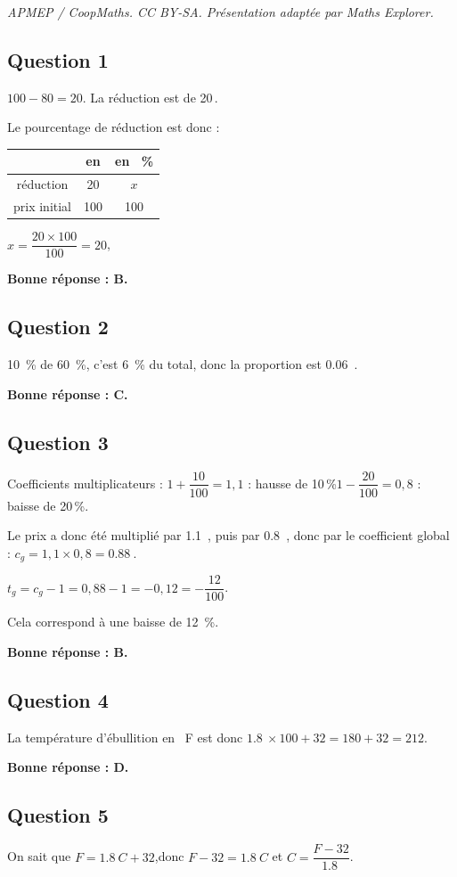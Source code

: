 \documentclass[10pt]{article}
\providecommand{\euro}{\texteuro}
\providecommand{\np}[2][]{{#2~#1}}
\providecommand{\euro}{{\text{€}}}
\renewcommand{\euro}{\ifmmode\text{\texteuro}\else\texteuro\fi}
\begin{document}
\noindent\textit{APMEP / CoopMaths. CC BY-SA. Présentation adaptée par Maths Explorer.}\par\medskip
\subsection*{Question 1}
	$100 - 80  =  20$.
	\quad
	La réduction est de 20\,\euro{}.

	Le pourcentage de réduction est donc :\quad
		\begin{tabular}{c|c|c}
	&en \euro  &en ~\% \\\hline
		réduction	& 20 &$x$  \\\hline
		prix initial&100&100\\
	\end{tabular}\qquad
	\mbox{$x = \dfrac{20\times100}{100} = 20$},

	\textbf{Bonne réponse : B.}

\subsection*{Question 2}
	10~\% de 60~\%, c'est 6~\% du total, donc la proportion est \np{0.06}.

	\textbf{Bonne réponse : C.}

\subsection*{Question 3}
	Coefficients multiplicateurs : \quad $1 + \dfrac{10}{100}  =  1,1$ : hausse de 10\,\%\quad $1 - \dfrac{20}{100}  = 0,8$ : baisse de 20\,\%.

	Le prix a donc été multiplié par \np{1.1}, puis par \np{0.8}, donc par le coefficient global : \quad $c_g  =   1,1 \times 0,8  =  \np{0.88}$.

	$t_g  =  c_g - 1  =  0,88 - 1  =  -0,12  =  -\dfrac{12}{100}$.

	Cela correspond à une baisse de 12~\%.

	\textbf{Bonne réponse : B.}

\subsection*{Question 4}
	La température d'ébullition en ~\textdegree{}F est donc \quad  \mbox{$\np{1.8}\times100+32 = 180+32 = 212$}.

	\textbf{Bonne réponse : D.}

\subsection*{Question 5}
	On sait que \quad \mbox{$F = \np{1.8} C+32$},\quad  donc  \quad \mbox{$F-32 = \np{1.8} C$} \quad et \quad \mbox{$C = \dfrac{F-32}{\np{1.8}}$}.
\end{document}

